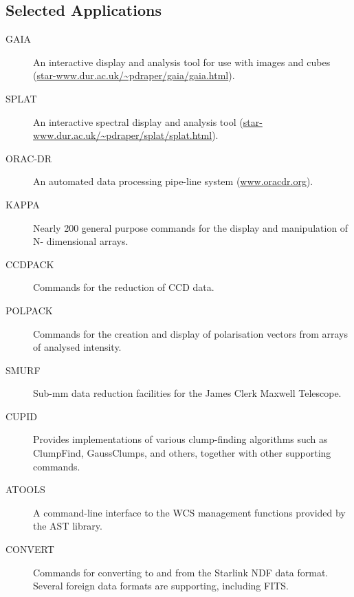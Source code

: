 \subsection{Selected Applications}
\begin{description}
\item[GAIA] An interactive display and analysis tool for use with images and cubes (\url{star-www.dur.ac.uk/~pdraper/gaia/gaia.html}).
\item[SPLAT] An interactive spectral display and analysis tool (\url{star-www.dur.ac.uk/~pdraper/splat/splat.html}).
\item[ORAC-DR] An automated data processing pipe-line system
(\url{www.oracdr.org}).
\item[KAPPA] Nearly 200 general purpose commands for the display and manipulation of N- dimensional arrays.
\item[CCDPACK] Commands for the reduction of CCD data.
\item[POLPACK] Commands for the creation and display of polarisation vectors from arrays of analysed intensity.
\item[SMURF] Sub-mm data reduction facilities for the James Clerk Maxwell Telescope.
\item[CUPID] Provides implementations of various clump-finding algorithms such as ClumpFind, GaussClumps, and others, together with other supporting commands.
\item[ATOOLS] A command-line interface to the WCS management functions provided by the AST library.
\item[CONVERT] Commands for converting to and from the Starlink NDF data format. Several foreign data formats are supporting, including FITS.
\end{description}

